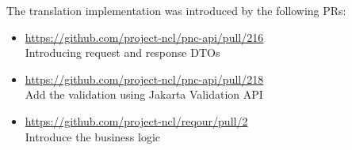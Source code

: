 \documentclass[../main.text]{subfiles}
\begin{document}
The translation implementation was introduced by the following PRs:
\begin{itemize}
    \item \url{https://github.com/project-ncl/pnc-api/pull/216}\\
    Introducing request and response DTOs

    \item \url{https://github.com/project-ncl/pnc-api/pull/218}\\
    Add the validation using Jakarta Validation API

    \item \url{https://github.com/project-ncl/reqour/pull/2}\\
    Introduce the business logic
\end{itemize}
\end{document}

